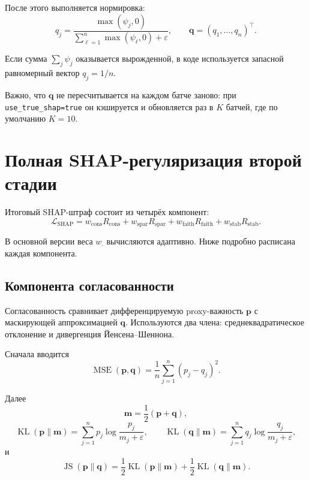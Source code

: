 \documentclass[11pt]{article}
\begin{document}
После этого выполняется нормировка:
\begin{equation}
 q_j = \frac{\max(\psi_j,0)}{\sum_{\ell=1}^{n} \max(\psi_{\ell},0) + \varepsilon},
 \qquad
 \mathbf{q} = (q_1,\dots,q_n)^\top.
\end{equation}

Если сумма $\sum_j \psi_j$ оказывается вырожденной, в коде используется запасной равномерный вектор $q_j = 1/n$.

Важно, что $\mathbf{q}$ не пересчитывается на каждом батче заново: при \texttt{use\_true\_shap=true} он кэшируется и обновляется раз в $K$ батчей, где по умолчанию $K=10$.

\section{Полная SHAP-регуляризация второй стадии}

Итоговый SHAP-штраф состоит из четырёх компонент:
\begin{equation}
\mathcal{L}_{\mathrm{SHAP}} = w_{\mathrm{cons}} R_{\mathrm{cons}} + w_{\mathrm{spar}} R_{\mathrm{spar}} + w_{\mathrm{faith}} R_{\mathrm{faith}} + w_{\mathrm{stab}} R_{\mathrm{stab}}.
\end{equation}

В основной версии веса $w_{\cdot}$ вычисляются адаптивно. Ниже подробно расписана каждая компонента.

\subsection{Компонента согласованности}

Согласованность сравнивает дифференцируемую proxy-важность $\mathbf{p}$ с маскирующей аппроксимацией $\mathbf{q}$. Используются два члена: среднеквадратическое отклонение и дивергенция Йенсена--Шеннона.

Сначала вводится
\begin{equation}
\operatorname{MSE}(\mathbf{p},\mathbf{q}) = \frac{1}{n} \sum_{j=1}^{n} (p_j - q_j)^2.
\end{equation}

Далее
\begin{equation}
\mathbf{m} = \frac{1}{2}(\mathbf{p}+\mathbf{q}),
\end{equation}
\begin{equation}
\operatorname{KL}(\mathbf{p}\|\mathbf{m}) = \sum_{j=1}^{n} p_j \log \frac{p_j}{m_j + \varepsilon},
\qquad
\operatorname{KL}(\mathbf{q}\|\mathbf{m}) = \sum_{j=1}^{n} q_j \log \frac{q_j}{m_j + \varepsilon},
\end{equation}
и
\begin{equation}
\operatorname{JS}(\mathbf{p}\|\mathbf{q}) = \frac{1}{2}\operatorname{KL}(\mathbf{p}\|\mathbf{m}) + \frac{1}{2}\operatorname{KL}(\mathbf{q}\|\mathbf{m}).
\end{equation}
\end{document}

